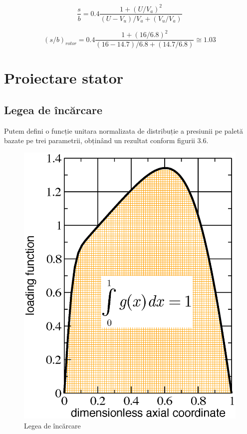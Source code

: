\begin{equation}
\frac{s}{b} = 0.4 \frac{1 + (U / V_a)^2 } {(U - V_u) / V_a + (V_u / V_a)}
\end{equation}

\begin{equation}
(s/b)_{rotor} = 0.4 \frac{1 + (16 / 6.8)^2 } {(16 - 14.7) / 6.8 + (14.7 / 6.8)} \cong 1.03
\end{equation}

\clearpage


\section{Proiectare stator}

\subsection{Legea de încărcare}

Putem defini o funcție unitara normalizata de distribuție a presiunii pe paletă bazate pe trei parametrii, obținând un rezultat conform figurii 3.6.

\begin{figure}[h]
	\centering
	\includegraphics[scale=0.6]{figures/legea_de_incarcare.eps}
	\caption{Legea de încărcare}
	\label{Legea de încărcare}
\end{figure}

